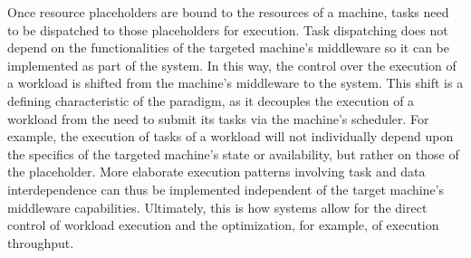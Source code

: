 \documentclass{sig-alternate}
\begin{document}
 

Once resource placeholders are bound to the resources of a machine, tasks need
to be dispatched to those placeholders for execution. Task dispatching does not
depend on the functionalities of the targeted machine's middleware so it can be
implemented as part of the \pilotjob system. In this way, the control over the
execution of a workload is shifted from the machine's middleware to the \pilot
system. This shift is a defining characteristic of the \pilot paradigm, as it
decouples the execution of a workload from the need to submit its tasks via the
machine's scheduler.  For example, the execution of tasks of a workload will not
individually depend upon the specifics of the targeted machine's state or
availability, but rather on those of the placeholder.
More elaborate execution patterns involving task and data interdependence can
thus be implemented independent of the target machine's middleware
capabilities. Ultimately, this is how \pilotjob systems allow for the direct
control of workload execution and the optimization, for example, of execution
throughput.


\end{document}
